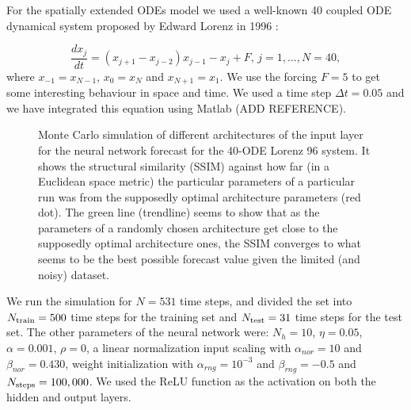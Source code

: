 \documentclass[journal]{IEEEtran}
\begin{document}
For the spatially extended ODEs model we used a well-known 40 coupled ODE dynamical system proposed by Edward Lorenz in 1996 
\cite{articleLorenz96}:

\begin{equation}
\label{lorenz96equations}
\frac{dx_j}{dt}=\left( x_{j+1} - x_{j-2} \right ) x_{j-1} - x_j + F, \, j=1, \ldots, N=40,
\end{equation}
where $x_{-1}=x_{N-1}$, $x_0=x_N$ and $x_{N+1}=x_1$. We use the forcing $F=5$ to get some interesting behaviour in space and time. We used a time step $\Delta t=0.05$ and we have integrated this equation using Matlab (ADD REFERENCE).

\begin{figure}[!ht]
\centering
{}
\caption{Monte Carlo simulation of different architectures of the input layer for the neural network forecast for the 40-ODE Lorenz 96 system.
It shows the structural similarity (SSIM) against how far (in a Euclidean space metric) the particular parameters of a particular
run was from the supposedly optimal architecture parameters (red dot). The green line (trendline) seems to show that as the parameters
of a randomly chosen architecture get close to the supposedly optimal architecture ones, the SSIM converges to what seems to be the
best possible forecast value given the limited (and noisy) dataset.}
\label{MonteCarloSSIMversusParameterMetricDistanceLorenz96}
\end{figure}

We run the simulation for $N=531$ time steps, and divided the set into $N_{\textnormal{train}}=500$ time steps for the training set
and $N_{\textnormal{test}}=31$ time steps for the test set. The other parameters of the neural network were:
$N_h=10$, $\eta=0.05$, $\alpha=0.001$, $\rho=0$, a linear normalization input scaling with $\alpha_{nor} = 10$ and $\beta_{nor} = 0.430$, weight initialization with $\alpha_{rng} = 10^{-3}$ and $\beta_{rng} = -0.5$ and $N_{\textnormal{steps}}=100,000$. We used the ReLU function as the activation on both the hidden and output layers.
\end{document}
